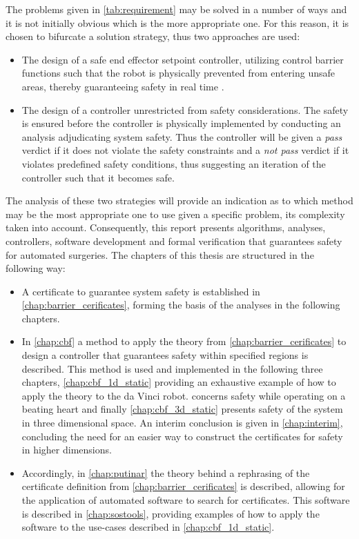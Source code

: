 The problems given in \autoref{tab:requirement} may be solved in a number of ways and it is not initially obvious which is the more appropriate one. For this reason, it is chosen to bifurcate a solution strategy, thus two approaches are used:
\vspace{-2mm}
\begin{itemize}
\item The design of a safe end effector setpoint controller, utilizing control barrier functions such that the robot is physically prevented from entering unsafe areas, thereby guaranteeing safety in real time \citep{bib:safety}. 
\item The design of a controller unrestricted from safety considerations. The safety is ensured before the controller is physically implemented by conducting an analysis adjudicating system safety. Thus the controller will be given a \textit{pass} verdict if it does not violate the safety constraints and a \textit{not pass} verdict if it violates predefined safety conditions, thus suggesting an iteration of the controller such that it becomes safe. 
\end{itemize}
The analysis of these two strategies will provide an indication as to which method may be the most appropriate one to use given a specific problem, its complexity taken into account. Consequently, this report presents algorithms, analyses, controllers, software development and formal verification that guarantees safety for automated surgeries.
The chapters of this thesis are structured in the following way:
\begin{itemize}
\item A certificate to guarantee system safety is established in \autoref{chap:barrier_cerificates}, forming the basis of the analyses in the following chapters.

\item In \autoref{chap:cbf} a method to apply the theory from \autoref{chap:barrier_cerificates} to design a controller that guarantees safety within specified regions is described. This method is used and implemented in the following three chapters, \autoref{chap:cbf_1d_static} providing an exhaustive example of how to apply the theory to the da Vinci robot.  concerns safety while operating on a beating heart and finally \autoref{chap:cbf_3d_static}  presents safety of the system in three dimensional space. An interim conclusion is given in \autoref{chap:interim}, concluding the need for an easier way to construct the certificates for safety in higher dimensions.

\item  Accordingly, in \autoref{chap:putinar} the theory behind a rephrasing of the certificate definition from \autoref{chap:barrier_cerificates} is described, allowing for the application of automated software to search for certificates. This software is described  in \autoref{chap:sostools}, providing examples of how to apply the software to the use-cases described in \autoref{chap:cbf_1d_static}.
\end{itemize}
